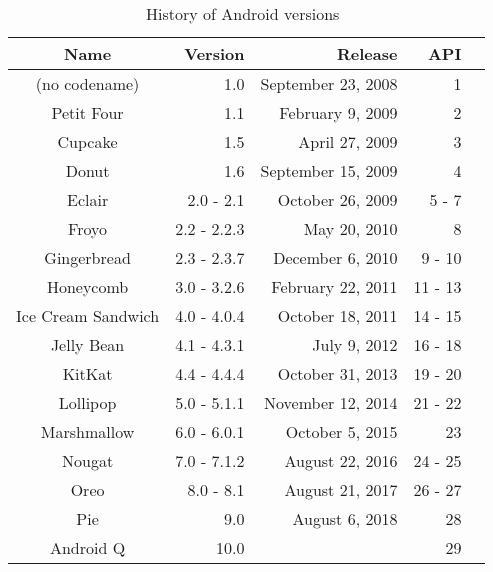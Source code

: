 \begin{table}[!ht]
\centering
  \label{table:background:versions}
  \caption[History of Android versions]{History of Android versions~\cite{android_android_2019}}
  \begin{tabular}{| c | r |  r | r | r |}
    \hline
    \textbf{Name}      & \textbf{Version} & \textbf{Release}   & \textbf{API} \\ \hline
    (no codename)      & 1.0              & September 23, 2008 & 1 \\ \hline
    Petit Four         & 1.1              & February 9, 2009   & 2 \\ \hline
    Cupcake            & 1.5              & April 27, 2009     & 3 \\ \hline
    Donut              & 1.6              & September 15, 2009 & 4 \\ \hline
    Eclair             & 2.0 - 2.1        & October 26, 2009   & 5 - 7 \\ \hline
    Froyo              & 2.2 - 2.2.3      & May 20, 2010       & 8 \\ \hline
    Gingerbread        & 2.3 - 2.3.7      & December 6, 2010   & 9 - 10 \\ \hline
    Honeycomb          & 3.0 - 3.2.6      & February 22, 2011  & 11 - 13 \\ \hline
    Ice Cream Sandwich & 4.0 - 4.0.4      & October 18, 2011   & 14 - 15 \\ \hline
    Jelly Bean         & 4.1 - 4.3.1      & July 9, 2012       & 16 - 18 \\ \hline
    KitKat             & 4.4 - 4.4.4      & October 31, 2013   & 19 - 20 \\ \hline
    Lollipop           & 5.0 - 5.1.1      & November 12, 2014  & 21 - 22 \\ \hline
    Marshmallow        & 6.0 - 6.0.1      & October 5, 2015    & 23 \\ \hline
    Nougat             & 7.0 - 7.1.2      & August 22, 2016    & 24 - 25 \\ \hline
    Oreo               & 8.0 - 8.1        & August 21, 2017    & 26 - 27 \\ \hline
    Pie                & 9.0              & August 6, 2018     & 28 \\ \hline
    Android Q          & 10.0             &                    & 29 \\
    \hline
  \end{tabular}
\end{table}
